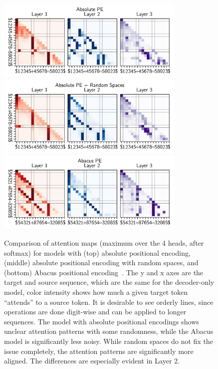 \begin{figure}[!h]
  \centering
  \includegraphics[width=0.8\textwidth]{fig/attn_map_abs_pe.png}
  \includegraphics[width=0.8\textwidth]{fig/attn_map_abs_pe_random_spaces.png}
  \includegraphics[width=0.8\textwidth]{fig/attn_map_abacus_pe.png}
  \caption{Comparison of attention maps (maximum over the 4 heads, after softmax) for models with (top) absolute positional encoding, (middle) absolute positional encoding with random spaces, and (bottom) Abacus positional encoding~\parencite{mcleish_transformers_2024}. The y and x axes are the target and source sequence, which are the same for the decoder-only model, color intensity shows how much a given target token ``attends'' to a source token. It is desirable to see orderly lines, since operations are done digit-wise and can be applied to longer sequences. The model with absolute positional encodings shows unclear attention patterns with some randomness, while the Abacus model is significantly less noisy. While random spaces do not fix the issue completely, the attention patterns are significantly more aligned. The differences are especially evident in Layer 2.}
  \label{fig:digit_align_attn_maps}
\end{figure}

